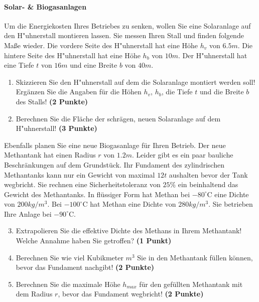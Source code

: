 \documentclass[a4paper, 9pt]{scrartcl}\usepackage[]{graphicx}\usepackage[]{xcolor}
\begin{document}
\paragraph{Solar- \& Biogasanlagen}



Um die Energiekosten Ihres Betriebes zu senken, wollen Sie eine Solaranlage
auf den H{"u}hnerstall montieren lassen. Sie messen Ihren Stall und finden
folgende Ma{\ss}e wieder. Die vordere Seite des H{"u}hnerstall hat eine H{\"o}he
$h_v$ von $6.5m$. Die hintere Seite des H{"u}hnerstall hat eine
H{\"o}he $h_b$ von $10m$. Der H{"u}hnerstall hat eine Tiefe $t$ von
$16m$ und eine Breite $b$ von $40m$.

\begin{enumerate}
\item Skizzieren Sie den H{"u}hnerstall auf dem die Solaranlage montiert
  werden soll! Erg{\"a}nzen Sie die Angaben f{\"u}r die H{\"o}hen $h_v$, $h_b$, die
  Tiefe $t$ und die Breite $b$ des Stalls!  \textbf{(2 Punkte)}
\item Berechnen Sie die Fl{\"a}che der schr{\"a}gen, neuen Solaranlage auf dem
  H{"u}hnerstall! \textbf{(3 Punkte)}
\end{enumerate}

Ebenfalls planen Sie eine neue Biogasanlage f{\"u}r Ihren Betrieb. Der neue
Methantank hat einen Radius $r$ von $1.2m$. Leider gibt es ein
paar bauliche Beschr{\"a}nkungen auf dem Grundst{\"u}ck. Ihr Fundament des
zylindrischen Methantanks kann nur ein Gewicht von maximal
$12t$ aushalten bevor der Tank wegbricht. Sie rechnen eine
Sicherheitstoleranz von $25\%$ ein beinhaltend das Gewicht des
Methantanks. In fl{\"u}ssiger Form hat
Methan bei $-80^\circ\text{C}$ eine Dichte von
$200kg/m^3$. Bei $-100^\circ\text{C}$ hat Methan eine Dichte
von $280kg/m^3$. Sie betrieben Ihre Anlage bei
$-90^\circ\text{C}$.

\begin{enumerate}
  \setcounter{enumi}{2}
\item Extrapolieren Sie die effektive Dichte des Methans in Ihrem
  Methantank! Welche Annahme haben Sie getroffen? \textbf{(1 Punkt)}
\item Berechnen Sie wie viel Kubikmeter $m^3$ Sie in den Methantank f{\"u}llen
  k{\"o}nnen, bevor das Fundament nachgibt! \textbf{(2 Punkte)}
\item Berechnen Sie die maximale H{\"o}he $h_{max}$ f{\"u}r den gef{\"u}llten
  Methantank mit dem Radius $r$, bevor das Fundament wegbricht! \textbf{(2
    Punkte)}
\end{enumerate}
\end{document}
